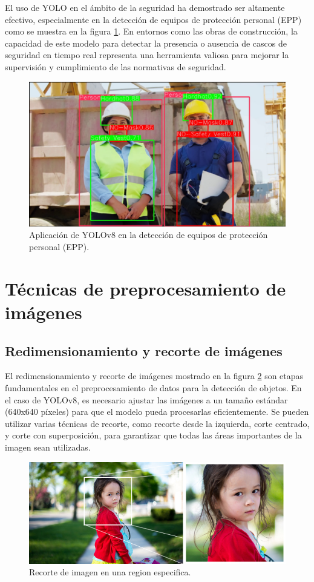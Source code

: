 El uso de YOLO en el ámbito de la seguridad ha demostrado ser altamente efectivo, especialmente en la detección de equipos de protección personal (EPP) como se muestra en la figura \ref{fig:yolo_application}. En entornos como las obras de construcción, la capacidad de este modelo para detectar la presencia o ausencia de cascos de seguridad en tiempo real representa una herramienta valiosa para mejorar la supervisión y cumplimiento de las normativas de seguridad.

\begin{figure}[!ht]
  \centering
  \includegraphics[width=.49\linewidth]{images/yolo_application.png}
  \caption{Aplicación de YOLOv8 en la detección de equipos de protección personal (EPP).}
  \label{fig:yolo_application}
\end{figure}

\section{Técnicas de preprocesamiento de imágenes}

\subsection{Redimensionamiento y recorte de imágenes}

El redimensionamiento y recorte de imágenes mostrado en la figura \ref{fig:image_cropping} son etapas fundamentales en el preprocesamiento de datos para la detección de objetos. En el caso de YOLOv8, es necesario ajustar las imágenes a un tamaño estándar (640x640 píxeles) para que el modelo pueda procesarlas eficientemente. Se pueden utilizar varias técnicas de recorte, como recorte desde la izquierda, corte centrado, y corte con superposición, para garantizar que todas las áreas importantes de la imagen sean utilizadas.

\begin{figure}[!ht]
  \centering
  \includegraphics[width=.49\linewidth]{images/cropping.jpg}
  \caption{Recorte de imagen en una region especifica.}
  \label{fig:image_cropping}
\end{figure}

